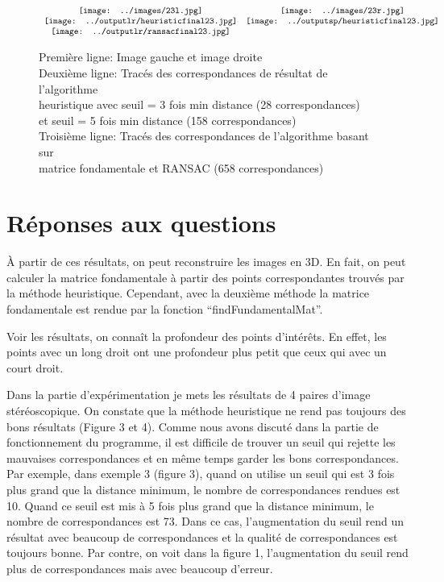 \documentclass[french,12pt,a4paper,oneside,notitlepage]{report}
\begin{document}
 \begin{figure}[ht]
	\begin{center}$
		\begin{array}[h]{cc}
		  \texttt{[image: ../images/23l.jpg]}&
		  \texttt{[image: ../images/23r.jpg]}\\
		  \texttt{[image: ../outputlr/heuristicfinal23.jpg]}&
		  \texttt{[image: ../outputsp/heuristicfinal23.jpg]}\\
		  \texttt{[image: ../outputlr/ransacfinal23.jpg]}&
		\end{array}$
	\end{center}
	\caption{Première ligne: Image gauche et image droite \\
	\hspace*{1.7cm} Deuxième ligne: Tracés des correspondances de résultat de 
l'algorithme \\
	\hspace*{1.7cm} heuristique avec seuil = 3 fois min distance (28 correspondances)\\
	\hspace*{1.7cm} et seuil = 5 fois min distance (158 correspondances) \\
	\hspace*{1.7cm} Troisième ligne: Tracés des correspondances de l'algorithme basant 
sur \\
	\hspace*{1.7cm} matrice fondamentale et RANSAC (658 correspondances)} 
\end{figure}

\clearpage
\section{Réponses aux questions}
À partir de ces résultats, on peut reconstruire les images en 3D. En fait, on peut 
calculer la matrice fondamentale à partir des points correspondantes trouvés par la 
méthode heuristique. Cependant, avec la deuxième méthode la matrice fondamentale est 
rendue par la fonction ``findFundamentalMat''.

Voir les résultats, on connaît la profondeur des points d'intérêts. En effet, les points 
avec un long droit ont une profondeur plus petit que ceux qui avec un court droit. 

Dans la partie d'expérimentation je mets les résultats de 4 paires d'image 
stéréoscopique. On constate que la méthode heuristique ne rend pas toujours des bons 
résultats (Figure 3 et 4). Comme nous avons discuté dans la partie de fonctionnement du 
programme, il est difficile de trouver un seuil qui rejette les mauvaises correspondances 
et en même temps garder les bons correspondances. Par exemple, dans exemple 3 (figure 3), 
quand on utilise un seuil qui est 3 fois plus grand que la distance minimum, le nombre de 
correspondances rendues est 10. Quand ce seuil est mis à 5 fois plus grand que la 
distance minimum, le nombre de correspondances est 73. Dans ce cas, l'augmentation du 
seuil rend un résultat avec beaucoup de correspondances et la qualité de correspondances 
est toujours bonne. Par contre, on voit dans la figure 1, l'augmentation du seuil rend 
plus de correspondances mais avec beaucoup d'erreur.
\end{document}
